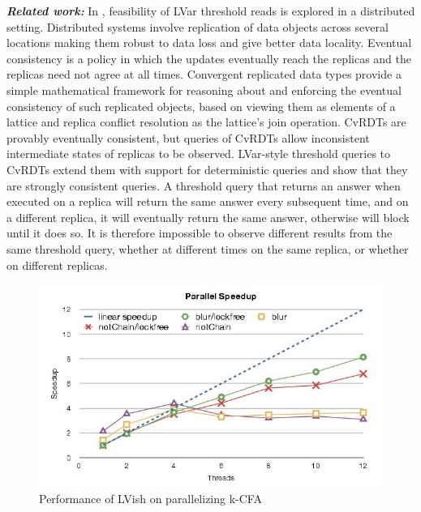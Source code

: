 \documentclass[twocolumn]{article}
\begin{document}
\textbf{\textit{Related work:}} In \cite{newton2}, feasibility of LVar threshold reads is explored in a distributed setting. Distributed systems involve replication of data objects across several locations making them robust to data loss and give better data locality. Eventual consistency is a policy in which the updates eventually reach the replicas and the replicas need not agree at all times. Convergent replicated data types provide a simple mathematical framework for reasoning about and enforcing the eventual consistency of such replicated objects, based on viewing them as elements of a lattice and replica conflict resolution as the lattice's join operation. CvRDTs are provably eventually consistent, but queries of CvRDTs allow inconsistent intermediate states of replicas to be observed. LVar-style threshold queries to CvRDTs extend them with support for deterministic queries and show that they are strongly consistent queries. A threshold query that returns an answer when executed on a replica will return the same answer every subsequent time, and on a different replica, it will eventually return the same answer, otherwise will block until it does so. It is therefore impossible to observe different results from the same threshold query, whether at different times on the same replica, or whether on different replicas.
\begin{figure}
\centerline{
\includegraphics[width=1.0\columnwidth]{Figures/speedup.jpg}
}
\caption{Performance of LVish on parallelizing k-CFA\cite{lkuper2}}
\label{Figure2}
\end{figure}
\end{document}
